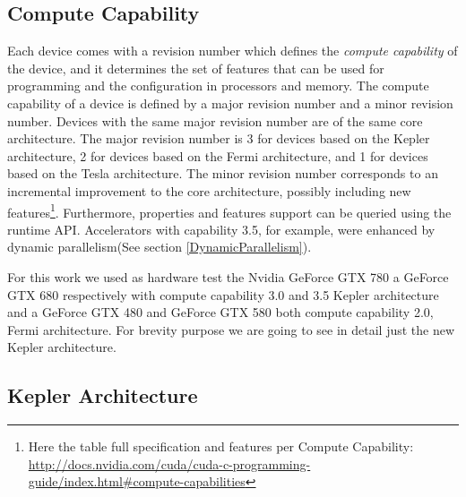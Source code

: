 \subsection{Compute Capability}\label{computeCapability}
Each device comes with a revision number which defines the \emph{compute
capability} of the device, and it determines the set of features that can be
used for programming and the configuration in processors and memory.
The compute capability of a device is defined by a major revision number and a
minor revision number. Devices with the same major revision number are of the
same core architecture. The major revision number is 3 for devices based on the Kepler architecture, 
2 for devices based on the Fermi architecture, and 1 for devices based on the Tesla architecture.
The minor revision number corresponds to an incremental improvement to the core
architecture, possibly including new features\footnote{Here the table full
specification and features per Compute Capability:
\url{http://docs.nvidia.com/cuda/cuda-c-programming-guide/index.html\#compute-capabilities}}.
Furthermore, properties and features support can be queried using the runtime
API.
 Accelerators with capability 3.5, for example, were enhanced by dynamic
 parallelism(See section \ref{DynamicParallelism}).
 
 For this work we used as hardware test the Nvidia GeForce GTX 780 a GeForce GTX
680  respectively with compute capability 3.0 and 3.5 Kepler architecture and a
GeForce GTX 480 and GeForce GTX 580 both compute capability 2.0, Fermi
architecture.
For brevity purpose we are going to see in detail just the new Kepler
architecture.
\FloatBarrier
\subsection{Kepler Architecture}\label{sect:keplerArch}

